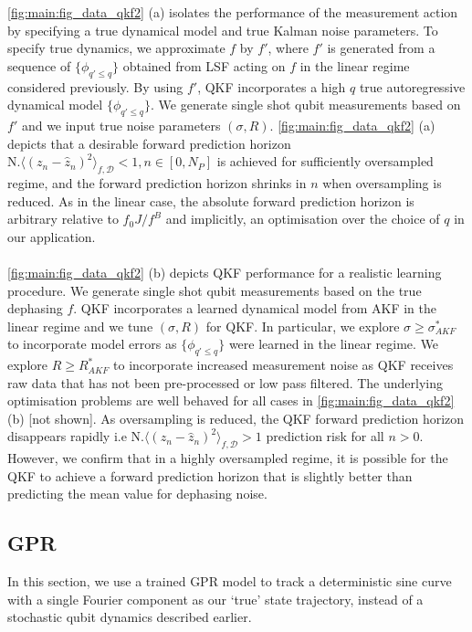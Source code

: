 \cref{fig:main:fig_data_qkf2} (a) isolates the performance of the measurement action by specifying a true dynamical model and true Kalman noise parameters. To specify true dynamics, we approximate $f$ by $f'$, where $f'$ is generated from a sequence of $\{ \phi_{q'\leq q}\}$ obtained from LSF acting on $f$ in the linear regime considered previously. By using $f'$, QKF incorporates a high $q$ true autoregressive dynamical model $\{ \phi_{q'\leq q}\}$. We generate single shot qubit measurements based on $f'$ and we input true noise parameters $(\sigma, R)$. \cref{fig:main:fig_data_qkf2} (a) depicts that a desirable forward prediction horizon $\text{N.} \langle (z_n - \hat{z}_n)^2 \rangle_{f, \mathcal{D}} < 1, n\in [0, N_P] $ is achieved for sufficiently oversampled regime, and the forward prediction horizon shrinks in $n$ when oversampling is reduced. As in the linear case, the absolute forward prediction horizon is arbitrary relative to $f_0 J / f^B$ and implicitly, an optimisation over the choice of $q$ in our application. 
\\
\\
\cref{fig:main:fig_data_qkf2} (b) depicts QKF performance for a realistic learning procedure. We generate single shot qubit measurements based on the true dephasing $f$. QKF incorporates a learned dynamical model from AKF in the linear regime and we tune $(\sigma, R)$ for QKF. In particular, we explore $\sigma \geq \sigma_{AKF}^*$ to incorporate model errors as $\{\phi_{q' \leq q}\}$ were learned in the linear regime.  We explore $R \geq R_{AKF}^*$ to incorporate increased measurement noise as QKF receives raw data that has not been pre-processed or low pass filtered. The underlying optimisation problems are well behaved for all cases in \cref{fig:main:fig_data_qkf2}(b) [not shown]. As oversampling is reduced, the QKF forward prediction horizon disappears rapidly i.e $\text{N.} \langle (z_n - \hat{z}_n)^2 \rangle_{f, \mathcal{D}} > 1 $ prediction risk for all $n>0$.  However, we confirm that in a highly oversampled regime, it is possible for the QKF to achieve a forward prediction horizon that is slightly better than predicting the mean value for dephasing noise. 

\subsection{GPR} 
In this section, we use a trained GPR model to track a deterministic sine curve with a single Fourier component as our `true' state trajectory, instead of a stochastic qubit dynamics described earlier. 

